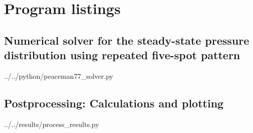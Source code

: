 \section{Program listings} %
\label{sec:program_listings}

\subsection{Numerical solver for the steady-state pressure distribution using repeated five-spot pattern} %
\label{sub:numerical_solver_for_the_steady_state_pressure_distribution_using_repeated_five_spot_pattern}


  {../../python/peaceman77_solver.py}

\clearpage
\subsection{Postprocessing: Calculations and plotting} %
\label{sub:postprocessing_calculations_and_plotting}

  {../../results/process_results.py}

